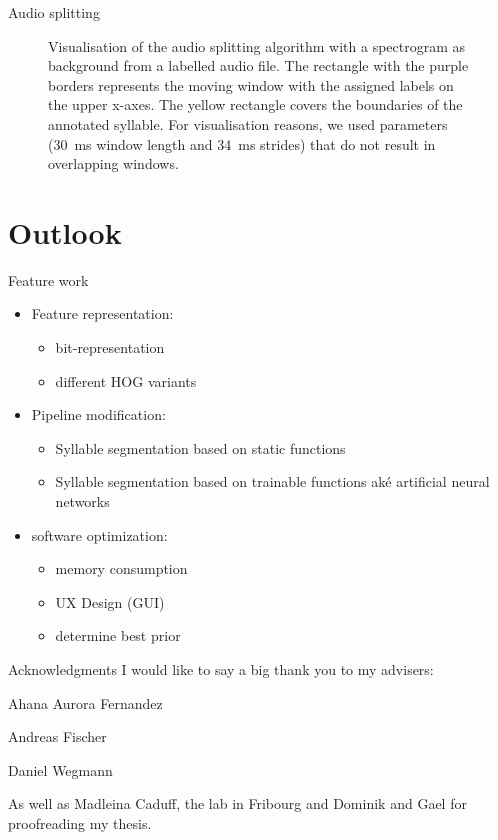 \documentclass[10pt]{beamer}
\begin{document}
\begin{frame}{Audio splitting}
\begin{figure}
\centering
    
    \caption{Visualisation of the audio splitting algorithm with a spectrogram as background from a labelled audio file. The rectangle with the purple borders represents the moving window with the assigned labels on the upper x-axes. The yellow rectangle covers the boundaries of the annotated syllable. For visualisation reasons, we used parameters (\SI{30}{\milli\second} window length and \SI{34}{\milli\second} strides) that do not result in overlapping windows.}
    \label{fig:moving_window}
\end{figure}
\end{frame}


\section{Outlook}
\begin{frame}{Feature work}
\begin{itemize}
\item Feature representation:
\begin{itemize}
\item bit-representation
\item different HOG variants
\end{itemize}
\item Pipeline modification:
\begin{itemize}
\item Syllable segmentation based on static functions
\item Syllable segmentation based on trainable functions aké artificial neural networks
\end{itemize}
\item software optimization:
\begin{itemize}
\item memory consumption
\item UX Design (GUI)
\item determine best prior
\end{itemize}
\end{itemize}
\end{frame}

\begin{frame}{Acknowledgments}
\centering
I would like to say a big thank you to my advisers:

\bigskip
Ahana Aurora Fernandez

Andreas Fischer

Daniel Wegmann

\bigskip
As well as Madleina Caduff, the lab in Fribourg and Dominik and Gael for proofreading my thesis.

\end{frame}
\end{document}
